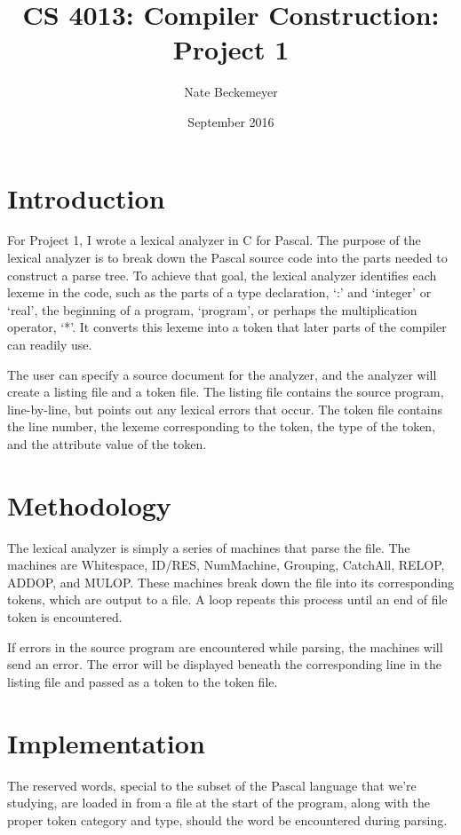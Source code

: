 \documentclass[titlepage]{article}
\author{Nate Beckemeyer}
\title{\textbf{CS 4013: Compiler Construction: Project 1}}
\date{September 2016}
\begin{document}
    \maketitle
    \section*{Introduction}
    For Project 1, I wrote a lexical analyzer in C for Pascal. The purpose
    of the lexical analyzer is to  break down the Pascal source code into
    the parts needed to construct a parse tree. To achieve that goal, the
    lexical analyzer identifies each lexeme in the code, such as the parts
    of a type declaration, `:' and `integer' or `real', the beginning of a
    program, `program', or perhaps the multiplication operator, `*'. It converts
    this lexeme into a token that later parts of the compiler can readily use.

    The user can specify a source document for the analyzer, and the
    analyzer will create a listing file and a token file. The listing file
    contains the source program, line-by-line, but points out any lexical
    errors that occur. The token file contains the line number, the lexeme
    corresponding to the token, the type of the token, and the attribute
    value of the token.

    \section{Methodology}
    The lexical analyzer is simply a series of machines that parse the file.
    The machines are Whitespace, ID/RES, NumMachine, Grouping, CatchAll,
    RELOP, ADDOP, and MULOP\@. These machines break down the file into its
    corresponding tokens, which are output to a file. A loop repeats this
    process until an end of file token is encountered.

    If errors in the source program are encountered while parsing, the machines
    will send an error. The error will be displayed beneath the corresponding
    line in the listing file and passed as a token to the token file.

    \section{Implementation}
    The reserved words, special to the subset of the Pascal language
    that we're studying, are loaded in from a file at the start of the
    program, along with the proper token category and type, should the
    word be encountered during parsing.
\end{document}
